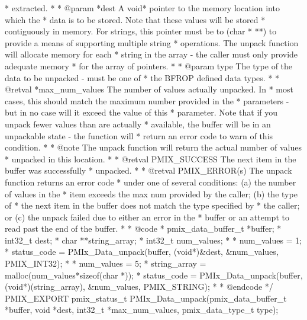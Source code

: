 \begin{codepar}
 * extracted.
 *
 * @param *dest A void* pointer to the memory location into which the
 * data is to be stored. Note that these values will be stored
 * contiguously in memory. For strings, this pointer must be to (char
 * **) to provide a means of supporting multiple string
 * operations. The unpack function will allocate memory for each
 * string in the array - the caller must only provide adequate memory
 * for the array of pointers.
 *
 * @param type The type of the data to be unpacked - must be one of
 * the BFROP defined data types.
 *
 * @retval *max_num_values The number of values actually unpacked. In
 * most cases, this should match the maximum number provided in the
 * parameters - but in no case will it exceed the value of this
 * parameter.  Note that if you unpack fewer values than are actually
 * available, the buffer will be in an unpackable state - the function will
 * return an error code to warn of this condition.
 *
 * @note The unpack function will return the actual number of values
 * unpacked in this location.
 *
 * @retval PMIX_SUCCESS The next item in the buffer was successfully
 * unpacked.
 *
 * @retval PMIX_ERROR(s) The unpack function returns an error code
 * under one of several conditions: (a) the number of values in the
 * item exceeds the max num provided by the caller; (b) the type of
 * the next item in the buffer does not match the type specified by
 * the caller; or (c) the unpack failed due to either an error in the
 * buffer or an attempt to read past the end of the buffer.
 *
 * @code
 * pmix_data_buffer_t *buffer;
 * int32_t dest;
 * char **string_array;
 * int32_t num_values;
 *
 * num_values = 1;
 * status_code = PMIx_Data_unpack(buffer, (void*)&dest, &num_values, PMIX_INT32);
 *
 * num_values = 5;
 * string_array = malloc(num_values*sizeof(char *));
 * status_code = PMIx_Data_unpack(buffer, (void*)(string_array), &num_values, PMIX_STRING);
 *
 * @endcode
 */
PMIX_EXPORT pmix_status_t PMIx_Data_unpack(pmix_data_buffer_t *buffer, void *dest,
                                           int32_t *max_num_values,
                                           pmix_data_type_t type);
\end{codepar}
\cspecificend


\subsection{}

